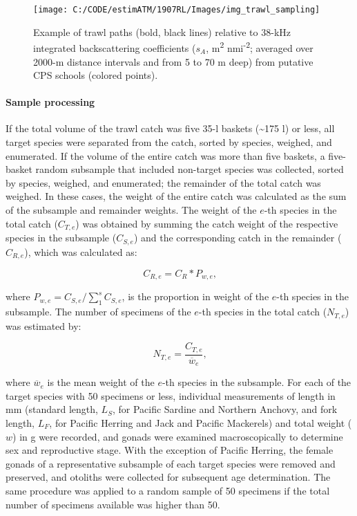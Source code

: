 \documentclass[]{article}
\let\oldparagraph\paragraph
\renewcommand{\paragraph}[1]{\oldparagraph{#1}\mbox{}}
\begin{document}
\begin{figure}[H]

{\centering \texttt{[image: C:/CODE/estimATM/1907RL/Images/img\_trawl\_sampling]} 

}

\caption{Example of trawl paths (bold, black lines) relative to 38-kHz integrated backscattering coefficients (\(s_A\), m\textsuperscript{2} nmi\textsuperscript{-2}; averaged over 2000-m distance intervals and from 5 to 70 m deep) from putative CPS schools (colored points).}\label{fig:trawling-locs}
\end{figure}

\hypertarget{methods-trawl-processing}{%
\paragraph{Sample processing}\label{methods-trawl-processing}}

If the total volume of the trawl catch was five 35-l baskets (\textasciitilde175 l) or less, all target species were separated from the catch, sorted by species, weighed, and enumerated. If the volume of the entire catch was more than five baskets, a five-basket random subsample that included non-target species was collected, sorted by species, weighed, and enumerated; the remainder of the total catch was weighed. In these cases, the weight of the entire catch was calculated as the sum of the subsample and remainder weights. The weight of the \(e\)-th species in the total catch (\(C_{T,e}\)) was obtained by summing the catch weight of the respective species in the subsample (\(C_{S,e}\)) and the corresponding catch in the remainder (\(C_{R,e}\)), which was calculated as:

\begin{equation}
 C_{R,e} = C_R*P_{w,e}\text{,}
 \label{eq:remainder-catch-weight}
\end{equation}

where \(P_{w,e} = C_{S,e}/\sum_1^sC_{S,e}\), is the proportion in weight of the \(e\)-th species in the subsample. The number of specimens of the \(e\)-th species in the total catch (\(N_{T,e}\)) was estimated by:

\begin{equation}
 N_{T,e} = \frac{C_{T,e}}{\overline{w}_e}\text{,}
 \label{eq:number-specimens-catch}
\end{equation}

where \(\overline{w}_e\) is the mean weight of the \(e\)-th species in the subsample. For each of the target species with 50 specimens or less, individual measurements of length in mm (standard length, \(L_S\), for Pacific Sardine and Northern Anchovy, and fork length, \(L_F\), for Pacific Herring and Jack and Pacific Mackerels) and total weight (\(w\)) in g were recorded, and gonads were examined macroscopically to determine sex and reproductive stage. With the exception of Pacific Herring, the female gonads of a representative subsample of each target species were removed and preserved, and otoliths were collected for subsequent age determination. The same procedure was applied to a random sample of 50 specimens if the total number of specimens available was higher than 50.
\end{document}
